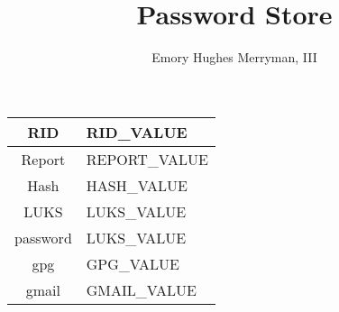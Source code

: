 \documentclass{article}
\begin{document}
\title{Password Store}
\author{Emory Hughes Merryman, III}
\maketitle
\begin{tabular}{||c|p{10cm}||}
  \hline
  RID & RID_VALUE \\ \hline
  Report & REPORT_VALUE \\ \hline
  Hash & HASH_VALUE \\ \hline
  LUKS & LUKS_VALUE \\ \hline
  password & LUKS_VALUE \\ \hline
  gpg & GPG_VALUE \\ \hline
  gmail & GMAIL_VALUE \\ \hline
  \hline
\end{tabular}
\end{document}
